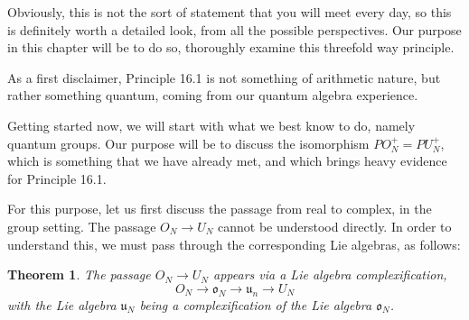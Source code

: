 \documentclass[12pt]{amsbook}
\newtheorem{theorem}{Theorem}[chapter]
\begin{document}
Obviously, this is not the sort of statement that you will meet every day, so this is definitely worth a detailed look, from all the possible perspectives. Our purpose in this chapter will be to do so, thoroughly examine this threefold way principle.

\bigskip

As a first disclaimer, Principle 16.1 is not something of arithmetic nature, but rather something quantum, coming from our quantum algebra experience.

\bigskip

Getting started now, we will start with what we best know to do, namely quantum groups. Our purpose will be to discuss the isomorphism $PO_N^+=PU_N^+$, which is something that we have already met, and which brings heavy evidence for Principle 16.1.

\bigskip

For this purpose, let us first discuss the passage from real to complex, in the group setting. The passage $O_N\to U_N$ cannot be understood directly. In order to understand this, we must pass through the corresponding Lie algebras, as follows:

\begin{theorem}
The passage $O_N\to U_N$ appears via a Lie algebra complexification,
$$O_N\to\mathfrak o_N\to\mathfrak u_n\to U_N$$
with the Lie algebra $\mathfrak u_N$ being a complexification of the Lie algebra $\mathfrak o_N$.
\end{theorem}
\end{document}
